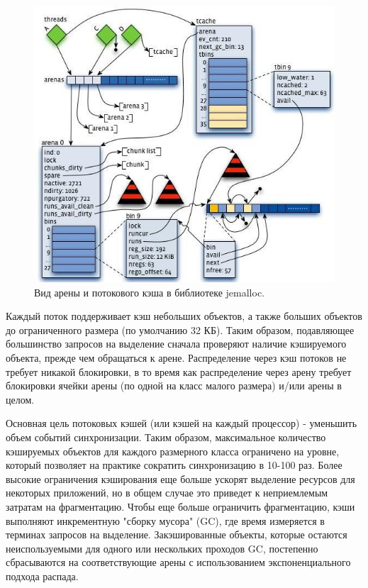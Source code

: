\begin{figure}[!h]
	\begin{center}
		\includegraphics[scale=0.6]{images/jemalloc-arena-and-thread-cache-layout.jpg}
		\caption{Вид арены и потокового кэша в библиотеке jemalloc.}
		\label{jemalloc-arena-and-thread-cache-layout}
	\end{center}
\end{figure}

Каждый поток поддерживает кэш небольших объектов, а также больших объектов до ограниченного размера (по умолчанию 32 КБ). Таким образом, подавляющее большинство запросов на выделение сначала проверяют наличие кэшируемого объекта, прежде чем обращаться к арене. Распределение через кэш потоков не требует никакой блокировки, в то время как распределение через арену требует блокировки ячейки арены (по одной на класс малого размера) и/или арены в целом.

Основная цель потоковых кэшей (или кэшей на каждый процессор) - уменьшить объем событий синхронизации. Таким образом, максимальное количество кэшируемых объектов для каждого размерного класса ограничено на уровне, который позволяет на практике сократить синхронизацию в 10-100 раз. Более высокие ограничения кэширования еще больше ускорят выделение ресурсов для некоторых приложений, но в общем случае это приведет к неприемлемым затратам на фрагментацию. Чтобы еще больше ограничить фрагментацию, кэши выполняют инкрементную "сборку мусора" (GC), где время измеряется в терминах запросов на выделение. Закэшированные объекты, которые остаются неиспользуемыми для одного или нескольких проходов GC, постепенно сбрасываются на соответствующие арены с использованием экспоненциального подхода распада.